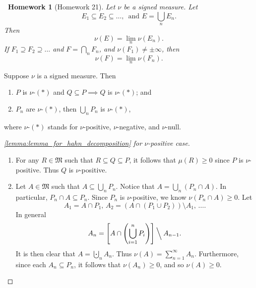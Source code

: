 \documentclass[notoc,notitlepage]{tufte-book}
\newtheorem*{homework}{\faCogs\ Homework}
\begin{document}
\begin{homework}[Homework 21]\label{homework:21}
  Let $\nu$ be a signed measure. Let
  \begin{equation*}
    E_1 \subseteq E_2 \subseteq \hdots,\, \text{ and }
    E = \bigcup_{n} E_n.
  \end{equation*}
  Then
  \begin{equation*}
    \nu(E) = \lim_{n} \nu(E_n).
  \end{equation*}
  If $F_1 \supseteq F_2 \supseteq \hdots$ and $F = \bigcap_{n} F_n$,
  and $\nu(F_1) \neq \pm \infty$, then
  \begin{equation*}
    \nu(F) = \lim_{n} \nu(F_n).
  \end{equation*}
\end{homework}

\begin{lemma}\label{lemma:lemma_for_hahn_decomposition}
  Suppose $\nu$ is a signed measure. Then
  \begin{enumerate}
    \item $P$ is $\nu$-$(*)$ and $Q \subseteq P \implies Q$ is $\nu$-$(*)$; and
    \item $P_n$ are $\nu$-$(*)$, then $\bigcup_{n} P_n$ is $\nu$-$(*)$,
  \end{enumerate}
  where $\nu$-$(*)$ stands for $\nu$-positive, $\nu$-negative, and $\nu$-null.
\end{lemma}

\begin{proof}[\cref{lemma:lemma_for_hahn_decomposition} for $\nu$-positive case]
  \begin{enumerate}
    \item For any $R \in \mathfrak{M}$ such that $R \subseteq Q \subseteq P$,
      it follows that $\mu(R) \geq 0$ since $P$ is $\nu$-positive.
      Thus $Q$ is $\nu$-positive.
    \item Let $A \in \mathfrak{M}$ such that $A \subseteq \bigcup_{n} P_n$.
      Notice that $A = \bigcup_{n} (P_n \cap A)$.
      In particular, $P_n \cap A \subseteq P_n$.
      Since $P_n$ is $\nu$-positive, we know $\nu(P_n \cap A) \geq 0$.
      Let
      \begin{equation*}
        A_1 = A \cap P_1,\, A_2 = (A \cap (P_1 \cup P_2)) \setminus A_1,\,
        \ldots.
      \end{equation*}
      In general
      \begin{equation*}
        A_n
        = \left[ A \cap \left( \bigcup_{i=1}^{n} P_i \right) \right]
          \mathbin{\Big\backslash} A_{n-1}.
      \end{equation*}
      It is then clear that $A = \bigcupdot_n A_n$.
      Thus $\nu(A) = \sum_{n=1}^{\infty} A_n$.
      Furthermore, since each $A_n \subseteq P_n$,
      it follows that $\nu(A_n) \geq 0$,
      and so $\nu(A) \geq 0$.
  \end{enumerate}
\end{proof}
\end{document}
